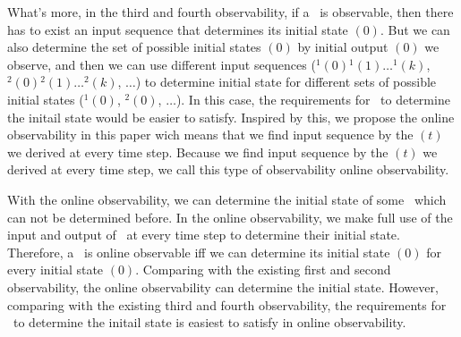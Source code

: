 What's more, in the third and fourth observability, if a \BCN\ is observable, then there has to exist an input sequence that determines its initial state \State$(0)$. But we can also determine the set of possible initial states \Ustate$(0)$ by initial output \Output$(0)$ we observe, and then we can use different input sequences (\Input$^{1}(0)$\Input$^{1}(1)\ldots$\Input$^{1}(k)$, \Input$^{2}(0)$\Input$^{2}(1)\ldots$\Input$^{2}(k)$, $\ldots$) to determine initial state for different sets of possible initial states (\Ustate$^{1}(0)$, \Ustate$^{2}(0)$, $\ldots$). In this case, the requirements for \BCNs\ to determine the initail state would be easier to satisfy. Inspired by this, we propose the online observability in this paper wich means that we find input sequence by the \Ustate$(t)$ we derived at every time step. Because we find input sequence by the \Ustate$(t)$ we derived at every time step, we call this type of observability online observability. 

With the online observability, we can determine the initial state of some \BCNs\ which can not be determined before.
In the online observability, we make full use of the input and output of \BCNs\ at every time step to determine their initial state. Therefore, a \BCN\ is online observable iff we can determine its initial state \State$(0)$ for every initial state \State$(0)$. Comparing with the existing first and second observability, the online observability can determine the initial state. However, comparing with the existing third and fourth observability, the requirements for \BCNs\ to determine the initail state is easiest to satisfy in online observability.  %

